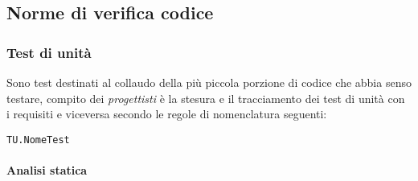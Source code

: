 \documentclass{scalatekids-article}
\begin{document}
\subsection{Norme di verifica codice}
\label{sec:NormeDiVerifica}

\subsubsection{Test di unità}

Sono test destinati al collaudo della più piccola porzione di codice che abbia senso
testare, compito dei \textit{progettisti} è la stesura e il tracciamento dei test di
unità con i requisiti e viceversa secondo le regole di nomenclatura seguenti:

\begin{center}
  \verb=TU.NomeTest=
\end{center}

\paragraph{Analisi statica}
\label{sec:AnalisiStatica}
\end{document}
